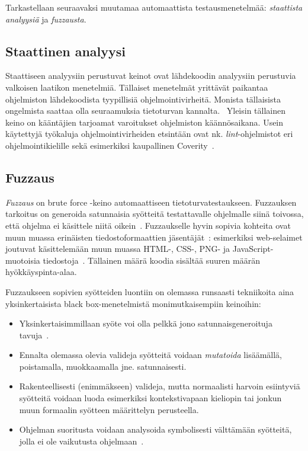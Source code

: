 Tarkastellaan seuraavaksi muutamaa automaattista testausmenetelmää: \emph{staattista analyysiä} ja \emph{fuzzausta}.

\subsection{Staattinen analyysi}

Staattiseen analyysiin perustuvat keinot ovat lähdekoodin analyysiin perustuvia valkoisen laatikon menetelmiä.
Tällaiset menetelmät yrittävät paikantaa ohjelmiston lähdekoodista tyypillisiä ohjelmointivirheitä.
Monista tällaisista ongelmista saattaa olla seuraamuksia tietoturvan kannalta.~\cite{Coverity}
Yleisin tällainen keino on kääntäjien tarjoamat varoitukset ohjelmiston käännösaikana.
Usein käytettyjä työkaluja ohjelmointivirheiden etsintään ovat nk. \emph{lint}-ohjelmistot
eri ohjelmointikielille sekä esimerkiksi kaupallinen Coverity~\cite{Coverity}.

\subsection{Fuzzaus}

\emph{Fuzzaus} on brute force -keino automaattiseen tietoturvatestaukseen.
Fuzzauksen tarkoitus on generoida satunnaisia syötteitä testattavalle ohjelmalle siinä toivossa,
että ohjelma ei käsittele niitä oikein~\cite{UnixReliability}. 
Fuzzaukselle hyvin sopivia kohteita ovat muun muassa erinäisten tiedostoformaattien jäsentäjät~\cite{SageArtikkeli,OuluBrowser}:
esimerkiksi web-selaimet joutuvat käsittelemään muun muassa HTML-, CSS-, PNG- ja JavaScript-muotoisia tiedostoja~\cite{OuluBrowser}.
Tällainen määrä koodia sisältää suuren määrän hyökkäyspinta-alaa.

Fuzzaukseen sopivien syötteiden luontiin on olemassa runsaasti tekniikoita aina yksinkertaisista black box-menetelmistä monimutkaisempiin keinoihin:
\begin{itemize}
    \item Yksinkertaisimmillaan syöte voi olla pelkkä jono satunnaisgeneroituja tavuja~\cite{UnixReliability}. \fixme[esimerkki]
    \item Ennalta olemassa olevia valideja syötteitä voidaan \emph{mutatoida} lisäämällä, poistamalla, muokkaamalla jne. satunnaisesti.
    \item Rakenteellisesti (enimmäkseen) valideja, mutta normaalisti harvoin esiintyviä syötteitä voidaan luoda esimerkiksi kontekstivapaan kieliopin tai jonkun muun formaalin syötteen määrittelyn perusteella.
    \item Ohjelman suoritusta voidaan analysoida symbolisesti välttämään syötteitä, jolla ei ole vaikutusta ohjelmaan~\cite{SageArtikkeli}.
\end{itemize}



